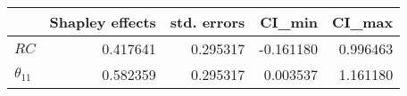 \begin{tabular}{lrrrr}
\toprule
{} &  Shapley effects &  std. errors &    CI_min &    CI_max \\
\midrule
$RC$          &         0.417641 &     0.295317 & -0.161180 &  0.996463 \\
$\theta_{11}$ &         0.582359 &     0.295317 &  0.003537 &  1.161180 \\
\bottomrule
\end{tabular}
